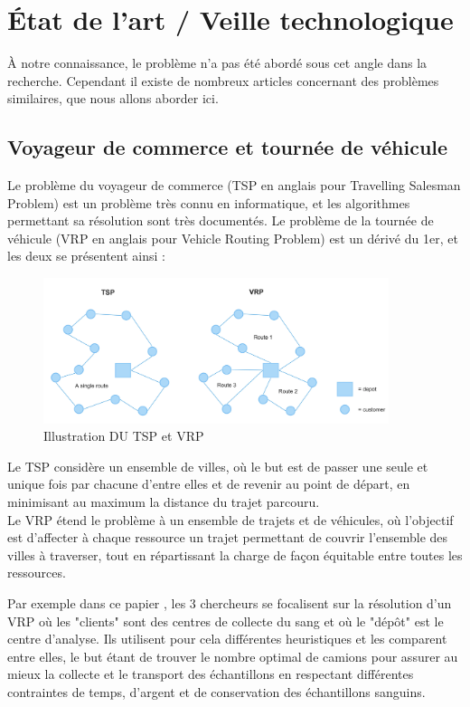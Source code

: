 \documentclass{polytech/polytech}
\numberwithin{figure}{chapter}
\begin{document}
\chapter{État de l'art / Veille technologique}

À notre connaissance, le problème n'a pas été abordé sous cet angle dans la recherche. Cependant il existe de nombreux articles concernant des problèmes similaires, que nous allons aborder ici.

\section{Voyageur de commerce et tournée de véhicule}

Le problème du voyageur de commerce (TSP en anglais pour Travelling Salesman Problem) est un problème très connu en informatique, et les algorithmes permettant sa résolution sont très documentés. Le problème de la tournée de véhicule (VRP en anglais pour Vehicle Routing Problem) est un dérivé du 1er, et les deux se présentent ainsi : 

\begin{figure}[h]
    \centering
    \includegraphics[width=0.9\textwidth]{pic/TSPVRP.png}
    \caption{Illustration DU TSP et VRP}
    \label{Illustration DU TSP et VRP}
\end{figure}

Le TSP considère un ensemble de villes, où le but est de passer une seule et unique fois par chacune d'entre elles et de revenir au point de départ, en minimisant au maximum la distance du trajet parcouru.\\
Le VRP étend le problème à un ensemble de trajets et de véhicules, où l'objectif est d'affecter à chaque ressource un trajet permettant de couvrir l'ensemble des villes à traverser, tout en répartissant la charge de façon équitable entre toutes les ressources. 

Par exemple dans ce papier \cite{VRP}, les 3 chercheurs se focalisent sur la résolution d'un VRP où les "clients" sont des centres de collecte du sang et où le "dépôt" est le centre d'analyse. Ils utilisent pour cela différentes \glspl{heuristique} et les comparent entre elles, le but étant de trouver le nombre optimal de camions pour assurer au mieux la collecte et le transport des échantillons en respectant différentes contraintes de temps, d'argent et de conservation des échantillons sanguins.
\end{document}
